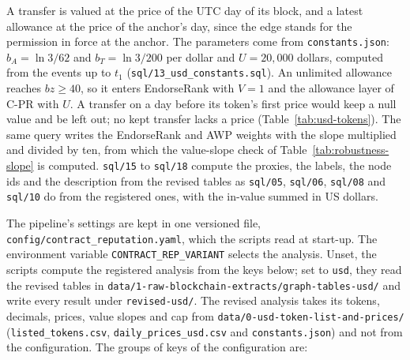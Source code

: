 A transfer is valued at the price of the UTC day of its block, and a latest allowance at the price of the anchor's day, since the edge stands for the permission in force at the anchor. The parameters come from \texttt{constants.json}: $b_A=\ln 3/62$ and $b_T=\ln 3/200$ per dollar and $U=20{,}000$ dollars, computed from the events up to $t_1$ (\texttt{sql/13\_usd\_constants.sql}). An unlimited allowance reaches $bz\geq 40$, so it enters EndorseRank with $V=1$ and the allowance layer of C-PR with $U$. A transfer on a day before its token's first price would keep a null value and be left out; no kept transfer lacks a price (Table~\ref{tab:usd-tokens}). The same query writes the EndorseRank and AWP weights with the slope multiplied and divided by ten, from which the value-slope check of Table~\ref{tab:robustness-slope} is computed. \texttt{sql/15} to \texttt{sql/18} compute the proxies, the labels, the node ids and the description from the revised tables as \texttt{sql/05}, \texttt{sql/06}, \texttt{sql/08} and \texttt{sql/10} do from the registered ones, with the in-value summed in US dollars.


The pipeline's settings are kept in one versioned file, \texttt{config/contract\_reputation.yaml}, which the scripts read at start-up. The environment variable \texttt{CONTRACT\_REP\_VARIANT} selects the analysis. Unset, the scripts compute the registered analysis from the keys below; set to \texttt{usd}, they read the revised tables in \texttt{data/1-raw-blockchain-extracts/graph-tables-usd/} and write every result under \texttt{revised-usd/}. The revised analysis takes its tokens, decimals, prices, value slopes and cap from \texttt{data/0-usd-token-list-and-prices/} (\texttt{listed\_tokens.csv}, \texttt{daily\_prices\_usd.csv} and \texttt{constants.json}) and not from the configuration. The groups of keys of the configuration are:


